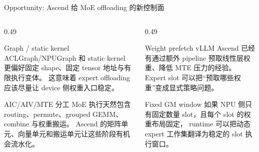 \documentclass[aspectratio=169,10pt]{beamer}
\begin{document}
\begin{frame}[t]{Opportunity: Ascend 给 MoE offloading 的新控制面}
\small
\vspace{-0.4em}

\begin{columns}[T,onlytextwidth]
\begin{column}{0.49\textwidth}
\begin{block}{Graph / static kernel}
\footnotesize
ACLGraph/NPUGraph 和 static kernel 更偏好固定 shape、固定 tensor 地址与有限执行变体。
这意味着 expert offloading 应该尽量让 device 侧权重入口稳定。
\end{block}

\begin{block}{AIC/AIV/MTE 分工}
\footnotesize
MoE 执行天然包含 routing、permute、grouped GEMM、combine 与权重搬运。
Ascend 的矩阵单元、向量单元和搬运单元让这些阶段有机会流水化。
\end{block}
\end{column}

\begin{column}{0.49\textwidth}
\begin{block}{Weight prefetch}
\footnotesize
vLLM Ascend 已经有通过额外 pipeline 预取线性层权重、降低 MTE 压力的经验。
Expert slot 可以把“预取哪些权重”变成显式策略问题。
\end{block}

\begin{block}{Fixed GM window}
\footnotesize
如果 NPU 侧只有固定数量 slot，且每个 slot 的权重布局固定，
runtime 可以把动态 expert 工作集翻译为稳定的 slot 执行窗口。
\end{block}
\end{column}
\end{columns}
\end{frame}
\end{document}
